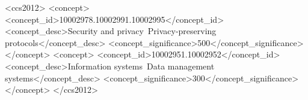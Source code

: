 \documentclass[acmsmall]{acmart}
\begin{document}
\begin{CCSXML}
<ccs2012>
 <concept>
  <concept_id>10002978.10002991.10002995</concept_id>
  <concept_desc>Security and privacy~Privacy-preserving protocols</concept_desc>
  <concept_significance>500</concept_significance>
 </concept>
 <concept>
    <concept_id>10002951.10002952</concept_id>
    <concept_desc>Information systems~Data management systems</concept_desc>
    <concept_significance>300</concept_significance>
 </concept>
</ccs2012>
\end{CCSXML}




\maketitle


















\end{document}
